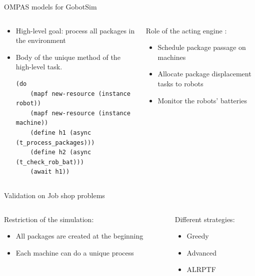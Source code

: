 \begin{frame}[fragile]{OMPAS models for GobotSim}
    \begin{columns}
        \begin{column}{0.5\textwidth}
            \begin{itemize}
                \item High-level goal: process all packages in the environment
                \item Body of the unique method of the high-level task.
                \setlength{\leftmargini}{0pt}

                \tiny
            \begin{lstlisting}
(do
    (mapf new-resource (instance robot))
    (mapf new-resource (instance machine))
    (define h1 (async (t_process_packages)))
    (define h2 (async (t_check_rob_bat)))
    (await h1))
            \end{lstlisting}    
            \end{itemize}
    

            
        \end{column}
        \begin{column}{0.5\textwidth}
Role of the acting engine : 
\begin{itemize}
    \item Schedule package passage on machines
    \item Allocate package displacement tasks to robots
    \item Monitor the robots' batteries 
\end{itemize} 
    \end{column}
    \end{columns}
    
\end{frame}

\begin{frame}{Validation on Job shop problems}
\centering
\begin{columns}
    \begin{column}{0.5\textwidth}
        Restriction of the simulation:
        \begin{itemize}
            \item All packages are created at the beginning
            \item Each machine can do a unique process
        \end{itemize}
    \end{column}
    \begin{column}{0.5\textwidth}
        Different strategies:
        \begin{itemize}
            \item Greedy
            \item Advanced
            \item ALRPTF
        \end{itemize}
    \end{column}
\end{columns}
\end{frame}

